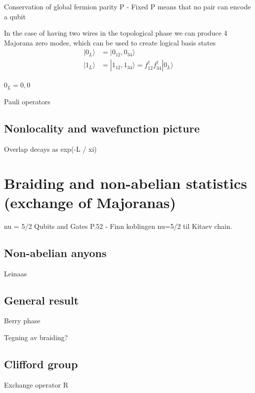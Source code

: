 Conservation of global fermion parity P
    - Fixed P means that no pair can encode a qubit



In the case of having two wires in the topological phase we can produce 4 Majorana zero modes, which can be used to create logical basis states
\begin{align}
    |0_L\rangle &= |0_{12}, 0_{34}\rangle \\  
    |1_L \rangle &= |1_{12}, 1_{34} \rangle = f_{12}^\dagger f_{34}^\dagger |0_L\rangle
\end{align}

$0_L = 0, 0$

Pauli operators

\subsection{Nonlocality and wavefunction picture}
Overlap decays as exp(-L / xi)


\cite{aliceaNonAbelianStatisticsTopological2011a}

\cite{aliceaNewDirectionsPursuit2012}


\section{Braiding and non-abelian statistics (exchange of Majoranas)}

nu = 5/2 Qubits and Gates P.52 \cite{nayakNonAbelianAnyonsTopological2008}
- Finn koblingen nu=5/2 til Kitaev chain.

\subsection{Non-abelian anyons}
Leinaas

\subsection{General result}
Berry phase

Tegning av braiding?



\subsection{Clifford group}
Exchange operator R \cite{sahuNoisyBraidingMajorana2026}

